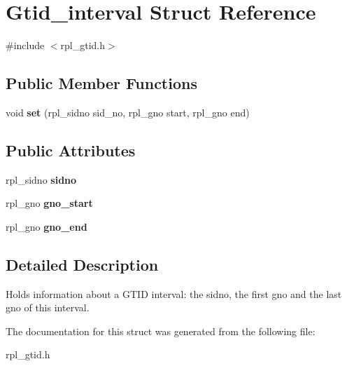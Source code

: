 \hypertarget{structGtid__interval}{}\section{Gtid\+\_\+interval Struct Reference}
\label{structGtid__interval}


{\ttfamily \#include $<$rpl\+\_\+gtid.\+h$>$}

\subsection*{Public Member Functions}
\begin{DoxyCompactItemize}
\item 
\mbox{\label{structGtid__interval_adfdaff092a03a95c6ac3b28a1d6d7151}} 
void {\bfseries set} (rpl\+\_\+sidno sid\+\_\+no, rpl\+\_\+gno start, rpl\+\_\+gno end)
\end{DoxyCompactItemize}
\subsection*{Public Attributes}
\begin{DoxyCompactItemize}
\item 
\mbox{\label{structGtid__interval_ae66a3e4c2a91be1d59a77b95a6fa608a}} 
rpl\+\_\+sidno {\bfseries sidno}
\item 
\mbox{\label{structGtid__interval_a0d696f5b6a8348ece10d808a927d3eef}} 
rpl\+\_\+gno {\bfseries gno\+\_\+start}
\item 
\mbox{\label{structGtid__interval_a7953d84e33bb140cae8995dc46de5252}} 
rpl\+\_\+gno {\bfseries gno\+\_\+end}
\end{DoxyCompactItemize}


\subsection{Detailed Description}
Holds information about a G\+T\+ID interval\+: the sidno, the first gno and the last gno of this interval. 

The documentation for this struct was generated from the following file\+:\begin{DoxyCompactItemize}
\item 
rpl\+\_\+gtid.\+h\end{DoxyCompactItemize}
